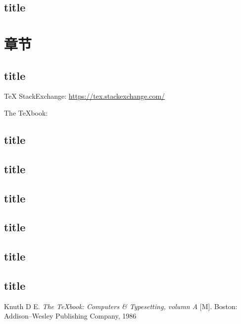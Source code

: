 \documentclass[oneside]{fduthesis}
\begin{document}
\section{title}

\chapter{章节}
\section{title}
\TeX{} StackExchange: \url{https://tex.stackexchange.com/}

The \TeX book: \cite{knuth1986texbook}
\section{title}
\section{title}
\section{title}
\section{title}
\section{title}
\section{title}

\begin{thebibliography}{9}
Knuth D E.
\newblock \textit{The \TeX book: Computers \& Typesetting, volumn A} [M].
\newblock Boston: Addison--Wesley Publishing Company, 1986
\end{thebibliography}
\end{document}
